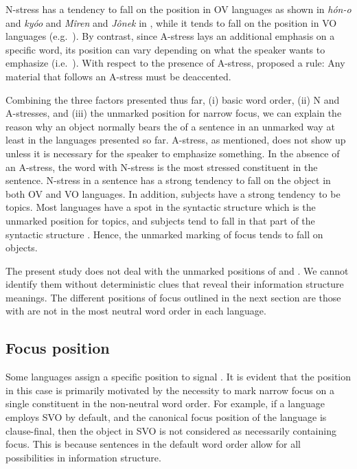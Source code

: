 \noindent N-stress has a tendency to fall on the 
position in OV languages as shown in \textit{h\'on-o} and
\textit{ky{\'o}o}  and \textit{M\^{i}ren} and
\textit{J\^{o}nek} in , while it tends to
fall on the  position in VO languages
(e.g.\ ). By contrast, since A-stress lays an additional
emphasis on a specific word, its position can vary depending on what
the speaker wants to emphasize (i.e.\ ). With respect to the
presence of A-stress, \citeauthor{ishihara:01} proposed a rule: Any
material that follows an A-stress must be deaccented.



Combining the three factors presented thus far, (i) basic word order,
(ii) N and A-stresses, and (iii) the unmarked position for narrow
focus, we can explain the reason why an object normally bears the
 of a sentence in an unmarked way at least in the languages
presented so far.  A-stress, as mentioned, does not show up unless it
is necessary for the speaker to emphasize something.  In the absence
of an A-stress, the word with N-stress is the most stressed
constituent in the sentence.  N-stress in a sentence has a strong
tendency to fall on the object in both OV and VO languages. In
addition, subjects have a strong tendency to be topics. Most languages
have a spot in the syntactic structure which is the unmarked position
for topics, and subjects tend to fall in that part of the syntactic
structure \citep{lambrecht:96}. Hence, the unmarked marking of focus
tends to fall on objects.


The present study does not deal with the unmarked positions of 
and . We cannot identify them without deterministic clues that
reveal their information structure meanings. The different positions
of focus outlined in the next section are those with are not in the
most neutral word order in each language.



\subsection{Focus position}
\label{4:ssec:focus-position}

Some languages assign a specific position to signal . It is
evident that the position in this case is primarily motivated by the
necessity to mark narrow focus on a single constituent in the
non-neutral word order. For example, if a language employs SVO by
default, and the canonical focus position of the language is
clause-final, then the object in SVO is not considered as necessarily
containing focus. This is because sentences in the
default word order allow for all possibilities in information
structure.


